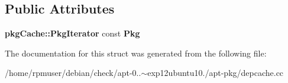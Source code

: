 \subsection*{\-Public \-Attributes}
\begin{DoxyCompactItemize}
\item 
{\bf pkg\-Cache\-::\-Pkg\-Iterator} const {\bfseries \-Pkg}\label{structCompareProviders_ab7ab4f9c732915ff2f790b32697427bc}

\end{DoxyCompactItemize}


\-The documentation for this struct was generated from the following file\-:\begin{DoxyCompactItemize}
\item 
/home/rpmuser/debian/check/apt-\/0..$\sim$exp12ubuntu10./apt-\/pkg/depcache.\-cc\end{DoxyCompactItemize}
